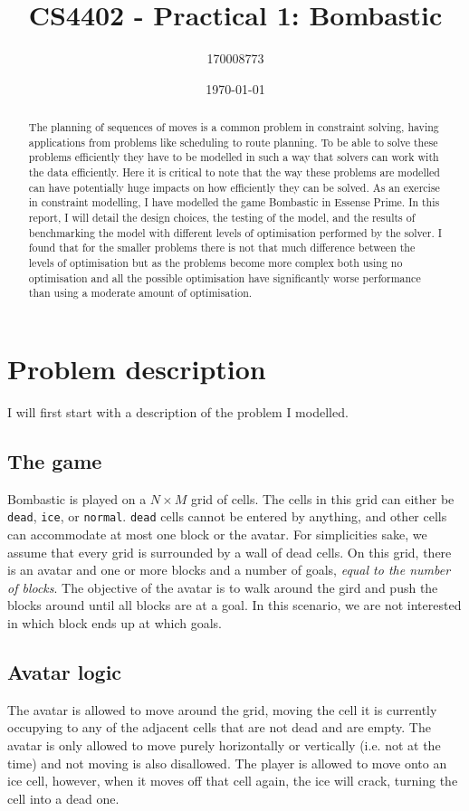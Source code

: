 \documentclass[british]{article}
\title{CS4402 - Practical 1: Bombastic}
\author{170008773}
\date{\today}
\newcommand{\code}[1]{\texttt{#1}}
\begin{document}
	\maketitle
	
	
	\begin{abstract}
		The planning of sequences of moves is a common problem in constraint solving, having applications from problems like scheduling to route planning. To be able to solve these problems efficiently they have to be modelled in such a way that solvers can work with the data efficiently. Here it is critical to note that the way these problems are modelled can have potentially huge impacts on how efficiently they can be solved. As an exercise in constraint modelling, I have modelled the game Bombastic in Essense Prime. In this report, I will detail the design choices, the testing of the model, and the results of benchmarking the model with different levels of optimisation performed by the solver. I found that for the smaller problems there is not that much difference between the levels of optimisation but as the problems become more complex both using no optimisation and all the possible optimisation have significantly worse performance than using a moderate amount of optimisation.  	
	\end{abstract}
	
	\section{Problem description}
	I will first start with a description of the problem I modelled. 
	\label{problem}
	\subsection{The game}
	Bombastic is played on a $N\times M$ grid of cells. The cells in this grid can either be \code{dead}, \code{ice}, or \code{normal}. \code{dead} cells cannot be entered by anything, and other cells can accommodate at most one block or the avatar. For simplicities sake, we assume that every grid is surrounded by a wall of dead cells. On this grid, there is an avatar and one or more blocks and a number of goals, \textit{equal to the number of blocks}. The objective of the avatar is to walk around the gird and push the blocks around until all blocks are at a goal. In this scenario, we are not interested in which block ends up at which goals.  
	
	
	\subsection{Avatar logic}
	The avatar is allowed to move around the grid, moving the cell it is currently occupying to any of the adjacent cells that are not dead and are empty. The avatar is only allowed to move purely horizontally or vertically (i.e. not at the time) and not moving is also disallowed.  The player is allowed to move onto an ice cell, however, when it moves off that cell again, the ice will crack, turning the cell into a dead one. 
	
\end{document}
